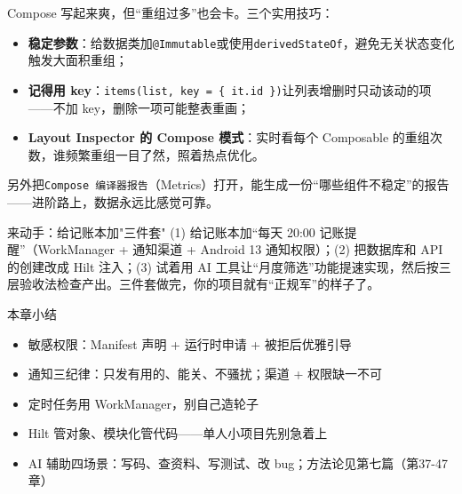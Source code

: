 
Compose 写起来爽，但“重组过多”也会卡。三个实用技巧：

\begin{itemize}
  \item \textbf{稳定参数}：给数据类加\texttt{@Immutable}或使用\texttt{derivedStateOf}，避免无关状态变化触发大面积重组；
  \item \textbf{记得用 key}：\texttt{items(list, key = \{ it.\allowbreak id \})}让列表增删时只动该动的项——不加 key，删除一项可能整表重画；
  \item \textbf{Layout Inspector 的 Compose 模式}：实时看每个 Composable 的重组次数，谁频繁重组一目了然，照着热点优化。
\end{itemize}

另外把\texttt{Compose 编译器报告}（Metrics）打开，能生成一份“哪些组件不稳定”的报告——进阶路上，数据永远比感觉可靠。

\begin{tcbpractice}{来动手：给记账本加"三件套"}
(1) 给记账本加“每天 20:00 记账提醒”（WorkManager + 通知渠道 + Android 13 通知权限）；(2) 把数据库和 API 的创建改成 Hilt 注入；(3) 试着用 AI 工具让“月度筛选”功能提速实现，然后按三层验收法检查产出。三件套做完，你的项目就有“正规军”的样子了。

\end{tcbpractice}

\begin{tcbsummary}{本章小结}
\begin{itemize}
  \item 敏感权限：Manifest 声明 + 运行时申请 + 被拒后优雅引导
  \item 通知三纪律：只发有用的、能关、不骚扰；渠道 + 权限缺一不可
  \item 定时任务用 WorkManager，别自己造轮子
  \item Hilt 管对象、模块化管代码——单人小项目先别急着上
  \item AI 辅助四场景：写码、查资料、写测试、改 bug；方法论见第七篇（第37-47章）
\end{itemize}

\end{tcbsummary}
